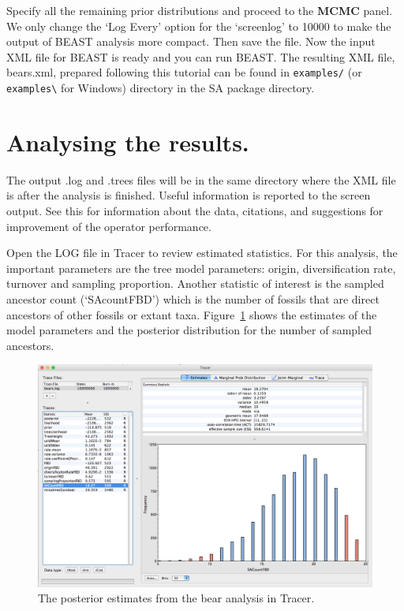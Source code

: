 \documentclass[12pt]{article}
\begin{document}
Specify all the remaining prior distributions and proceed to the {\bf MCMC} panel. We only change the `Log Every' option for the `screenlog' to 10000 to make the output of BEAST analysis more compact. Then save the file. Now the input XML file for BEAST is ready and you can run BEAST. The resulting XML file, bears.xml, prepared following this tutorial can be found in {\tt examples/} (or {\tt examples\textbackslash} for Windows) directory in the SA package directory. 



\section{Analysing the results.} 

The output .log and .trees files will be in the same directory where the XML file is after the analysis is finished. Useful information is reported to the screen output. See this for information about the data, citations, and suggestions for improvement of the operator performance.  

Open the LOG file in Tracer to review estimated statistics. For this analysis, the important parameters are the tree model parameters: origin, diversification rate, turnover and sampling proportion. Another statistic of interest is the sampled ancestor count (`SAcountFBD') which is the number of fossils that are direct ancestors of other fossils or extant taxa. Figure~\ref{fig:TracerOutput} shows the estimates of the model parameters and the posterior distribution for the number of sampled ancestors. 

\begin{figure}	
\centering
\includegraphics[width=\textwidth]{figures/TracerOutput}
\caption{The posterior estimates from the bear analysis in Tracer. \label{fig:TracerOutput}}
\end{figure}
\end{document}
